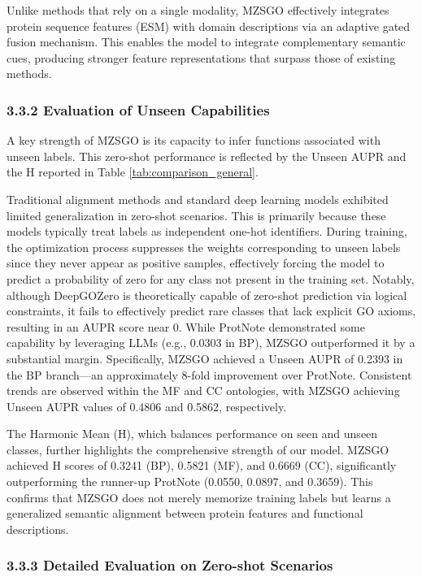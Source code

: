 \documentclass[unnumsec,webpdf,contemporary,large]{oup-authoring-template}%
\theoremstyle{thmstyleone}%
\theoremstyle{thmstyletwo}%
\theoremstyle{thmstylethree}%
\begin{document}
Unlike methods that rely on a single modality, MZSGO effectively integrates protein sequence features (ESM) with domain descriptions via an adaptive gated fusion mechanism. This enables the model to integrate complementary semantic cues, producing stronger feature representations that surpass those of existing methods.

\subsubsection{3.3.2 Evaluation of Unseen Capabilities}
A key strength of MZSGO is its capacity to infer functions associated with unseen labels. This zero-shot performance is reflected by the Unseen AUPR and the H reported in Table \ref{tab:comparison_general}.

Traditional alignment methods and standard deep learning models exhibited limited generalization in zero-shot scenarios. This is primarily because these models typically treat labels as independent one-hot identifiers. During training, the optimization process suppresses the weights corresponding to unseen labels since they never appear as positive samples, effectively forcing the model to predict a probability of zero for any class not present in the training set. Notably, although DeepGOZero is theoretically capable of zero-shot prediction via logical constraints, it fails to effectively predict rare classes that lack explicit GO axioms, resulting in an AUPR score near 0. While ProtNote demonstrated some capability by leveraging LLMs (e.g., 0.0303 in BP), MZSGO outperformed it by a substantial margin. Specifically, MZSGO achieved a Unseen AUPR of 0.2393 in the BP branch—an approximately 8-fold improvement over ProtNote. Consistent trends are observed within the MF and CC ontologies, with MZSGO achieving Unseen AUPR values of 0.4806 and 0.5862, respectively.

The Harmonic Mean (H), which balances performance on seen and unseen classes, further highlights the comprehensive strength of our model. MZSGO achieved H scores of 0.3241 (BP), 0.5821 (MF), and 0.6669 (CC), significantly outperforming the runner-up ProtNote (0.0550, 0.0897, and 0.3659). This confirms that MZSGO does not merely memorize training labels but learns a generalized semantic alignment between protein features and functional descriptions.

\subsubsection{3.3.3 Detailed Evaluation on Zero-shot Scenarios}
\end{document}
